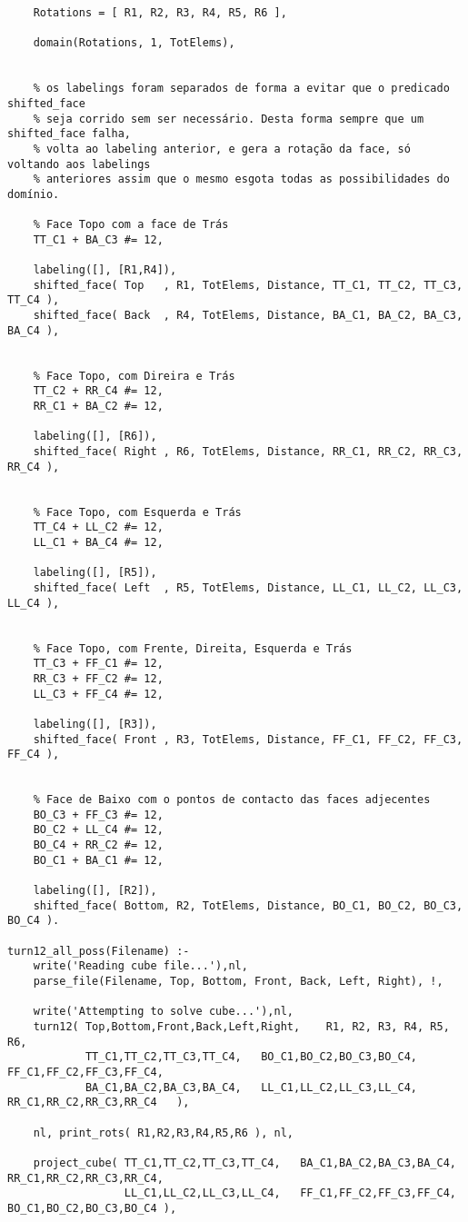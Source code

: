 \begin{lstlisting}
	Rotations = [ R1, R2, R3, R4, R5, R6 ],

	domain(Rotations, 1, TotElems),

	
	% os labelings foram separados de forma a evitar que o predicado shifted_face
	% seja corrido sem ser necessário. Desta forma sempre que um shifted_face falha,
	% volta ao labeling anterior, e gera a rotação da face, só voltando aos labelings
	% anteriores assim que o mesmo esgota todas as possibilidades do domínio.
	
	% Face Topo com a face de Trás
	TT_C1 + BA_C3 #= 12,
	
	labeling([], [R1,R4]),
	shifted_face( Top   , R1, TotElems, Distance, TT_C1, TT_C2, TT_C3, TT_C4 ),
	shifted_face( Back  , R4, TotElems, Distance, BA_C1, BA_C2, BA_C3, BA_C4 ),
	
	
	% Face Topo, com Direira e Trás 
	TT_C2 + RR_C4 #= 12,
	RR_C1 + BA_C2 #= 12,
	
	labeling([], [R6]),
	shifted_face( Right , R6, TotElems, Distance, RR_C1, RR_C2, RR_C3, RR_C4 ),
	

	% Face Topo, com Esquerda e Trás
	TT_C4 + LL_C2 #= 12,
	LL_C1 + BA_C4 #= 12,
	
	labeling([], [R5]),
	shifted_face( Left  , R5, TotElems, Distance, LL_C1, LL_C2, LL_C3, LL_C4 ),

	
	% Face Topo, com Frente, Direita, Esquerda e Trás
	TT_C3 + FF_C1 #= 12,
	RR_C3 + FF_C2 #= 12,
	LL_C3 + FF_C4 #= 12,
	
	labeling([], [R3]),
	shifted_face( Front , R3, TotElems, Distance, FF_C1, FF_C2, FF_C3, FF_C4 ),


	% Face de Baixo com o pontos de contacto das faces adjecentes
	BO_C3 + FF_C3 #= 12,
	BO_C2 + LL_C4 #= 12,
	BO_C4 + RR_C2 #= 12,
	BO_C1 + BA_C1 #= 12,
	
	labeling([], [R2]),
	shifted_face( Bottom, R2, TotElems, Distance, BO_C1, BO_C2, BO_C3, BO_C4 ).

turn12_all_poss(Filename) :-
	write('Reading cube file...'),nl,
	parse_file(Filename, Top, Bottom, Front, Back, Left, Right), !,
	
	write('Attempting to solve cube...'),nl,
	turn12( Top,Bottom,Front,Back,Left,Right,    R1, R2, R3, R4, R5, R6,
			TT_C1,TT_C2,TT_C3,TT_C4,   BO_C1,BO_C2,BO_C3,BO_C4,    FF_C1,FF_C2,FF_C3,FF_C4,
			BA_C1,BA_C2,BA_C3,BA_C4,   LL_C1,LL_C2,LL_C3,LL_C4,    RR_C1,RR_C2,RR_C3,RR_C4   ),

	nl,	print_rots( R1,R2,R3,R4,R5,R6 ), nl,
	
	project_cube( TT_C1,TT_C2,TT_C3,TT_C4,   BA_C1,BA_C2,BA_C3,BA_C4,   RR_C1,RR_C2,RR_C3,RR_C4,
                  LL_C1,LL_C2,LL_C3,LL_C4,   FF_C1,FF_C2,FF_C3,FF_C4,   BO_C1,BO_C2,BO_C3,BO_C4 ),
				  

\end{lstlisting}
